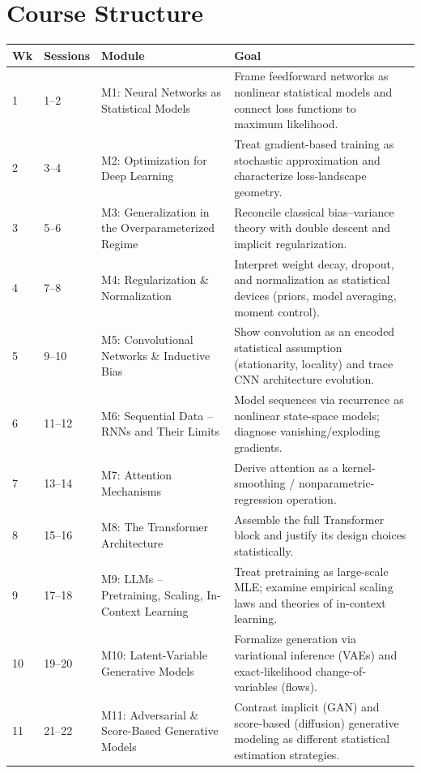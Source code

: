\documentclass[11pt]{article}
\begin{document}
\section{Course Structure}
\begin{longtable}{@{}p{0.9cm}p{2.6cm}p{4.3cm}p{7.4cm}@{}}
\toprule
\textbf{Wk} & \textbf{Sessions} & \textbf{Module} & \textbf{Goal} \\
\midrule
\endhead
1 & 1--2 & M1: Neural Networks as Statistical Models & Frame feedforward networks as nonlinear statistical models and connect loss functions to maximum likelihood. \\
2 & 3--4 & M2: Optimization for Deep Learning & Treat gradient-based training as stochastic approximation and characterize loss-landscape geometry. \\
3 & 5--6 & M3: Generalization in the Overparameterized Regime & Reconcile classical bias--variance theory with double descent and implicit regularization. \\
4 & 7--8 & M4: Regularization \& Normalization & Interpret weight decay, dropout, and normalization as statistical devices (priors, model averaging, moment control). \\
5 & 9--10 & M5: Convolutional Networks \& Inductive Bias & Show convolution as an encoded statistical assumption (stationarity, locality) and trace CNN architecture evolution. \\
6 & 11--12 & M6: Sequential Data -- RNNs and Their Limits & Model sequences via recurrence as nonlinear state-space models; diagnose vanishing/exploding gradients. \\
7 & 13--14 & M7: Attention Mechanisms & Derive attention as a kernel-smoothing / nonparametric-regression operation. \\
8 & 15--16 & M8: The Transformer Architecture & Assemble the full Transformer block and justify its design choices statistically. \\
9 & 17--18 & M9: LLMs -- Pretraining, Scaling, In-Context Learning & Treat pretraining as large-scale MLE; examine empirical scaling laws and theories of in-context learning. \\
10 & 19--20 & M10: Latent-Variable Generative Models & Formalize generation via variational inference (VAEs) and exact-likelihood change-of-variables (flows). \\
11 & 21--22 & M11: Adversarial \& Score-Based Generative Models & Contrast implicit (GAN) and score-based (diffusion) generative modeling as different statistical estimation strategies. \\

\end{longtable}
\end{document}
